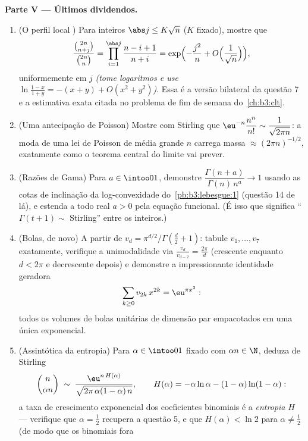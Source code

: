 \begin{problem}
\medskip
\noindent\textbf{Parte V --- Últimos dividendos.}
\begin{enumerate}[resume]
  \item (O perfil local ) Para inteiros $\abs j \leq
        K\sqrt n$ ($K$ fixado),
        mostre que
        \[
        \frac{\binom{2n}{n+j}}{\binom{2n}{n}} =
        \prod_{i=1}^{\abs j}\frac{n - i + 1}{n + i}
        = \exp\Bigl(-\frac{j^2}n +
        O\Bigl(\frac1{\sqrt n}\Bigr)\Bigr),
        \]
        uniformemente em $j$ \emph{(tome logaritmos e use $\ln
        \frac{1-x}{1+y} = -(x + y) + O(x^2 + y^2)$)}.
        Essa é a versão bilateral da questão 7 e a estimativa exata
        citada no problema de fim de semana do~\cref{ch:b3:clt}.
  \item (Uma antecipação de Poisson) Mostre com Stirling que $\eu^{-n}\dfrac{n^n}{n!} \sim \dfrac1{\sqrt{2\pi n}}$: a
        moda de uma lei de Poisson de média grande $n$ carrega massa
        $\approx (2\pi n)^{-1/2}$, exatamente como o teorema central do limite vai prever.
  \item (Razões de Gama) Para $a \in \intoo01$, demonstre $\dfrac{\Gamma(n + a)}{\Gamma(n)\,n^a} \to 1$ usando as cotas de
        inclinação da log-convexidade do~\cref{pb:b3:lebesgue:1} (questão 14 de
        lá), e estenda a todo real $a > 0$ pela equação funcional.
        (É isso que significa ``$\Gamma(t+1) \sim$ Stirling'' entre os inteiros.)
  \item (Bolas, de novo) A partir de $v_d = \pi^{d/2}/\Gamma(\frac d2
        + 1)$: tabule $v_1, \dots, v_7$ exatamente,
        verifique a unimodalidade via $\frac{v_d}{v_{d-2}} = \frac{2\pi}d$ (crescente enquanto $d < 2\pi$ e
        decrescente depois) e demonstre a impressionante identidade
        geradora
        \[
        \sum_{k\geq0}v_{2k}\,x^{2k} = \eu^{\pi x^2} :
        \]
        todos os volumes de bolas unitárias de dimensão par empacotados
        em uma única exponencial.
  \item (Assintótica da entropia) Para $\alpha \in \intoo01$ fixado com $\alpha n \in \N$, deduza de
        Stirling
        \[
        \binom{n}{\alpha n} \;\sim\;
        \frac{\eu^{n\,H(\alpha)}}
        {\sqrt{2\pi\,\alpha(1-\alpha)\,n}},
        \qquad
        H(\alpha) = -\alpha\ln\alpha -
        (1-\alpha)\ln(1-\alpha) :
        \]
        a taxa de crescimento exponencial dos coeficientes binomiais é
        a \emph{entropia} $H$ --- verifique que $\alpha =
        \frac12$ recupera a
        questão 5, e que $H(\alpha) <
        \ln2$ para $\alpha \neq \frac12$ (de modo que os binomiais fora

\end{enumerate}
\end{problem}
